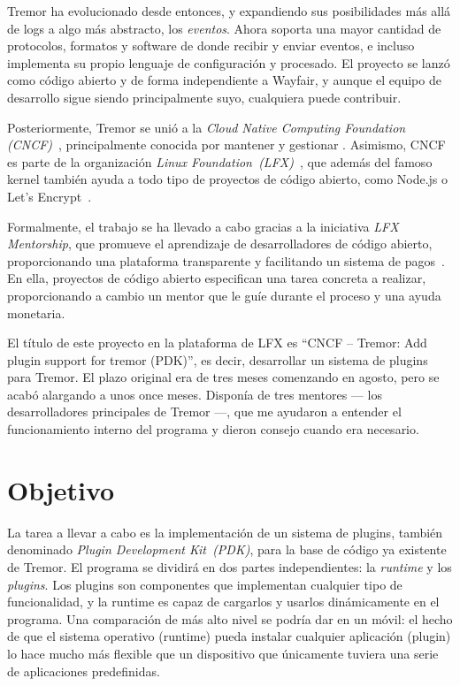 Tremor ha evolucionado desde entonces, y expandiendo sus posibilidades más allá
de logs a algo más abstracto, los \emph{eventos}. Ahora soporta una mayor
cantidad de protocolos, formatos y software de donde recibir y enviar eventos, e
incluso implementa su propio lenguaje de configuración y procesado. El proyecto
se lanzó como código abierto y de forma independiente a Wayfair, y aunque el
equipo de desarrollo sigue siendo principalmente suyo, cualquiera puede
contribuir.

Posteriormente, Tremor se unió a la \emph{Cloud Native Computing Foundation
(CNCF)}~\cite{cncf}, principalmente conocida por mantener y gestionar
. Asimismo, CNCF es parte de la organización \emph{Linux
Foundation~(LFX)}~\cite{lfx}, que además del famoso kernel también ayuda a todo
tipo de proyectos de código abierto, como Node.js o Let's
Encrypt~\cite{lfx_projects}.

Formalmente, el trabajo se ha llevado a cabo gracias a la iniciativa \emph{LFX
Mentorship}, que promueve el aprendizaje de desarrolladores de código abierto,
proporcionando una plataforma transparente y facilitando un sistema de
pagos~\cite{lfx_mentorship}. En ella, proyectos de código abierto especifican
una tarea concreta a realizar, proporcionando a cambio un mentor que le guíe
durante el proceso y una ayuda monetaria.

El título de este proyecto en la plataforma de LFX es ``CNCF -- Tremor: Add
plugin support for tremor (PDK)'', es decir, desarrollar un sistema de plugins
para Tremor. El plazo original era de tres meses comenzando en agosto, pero se
acabó alargando a unos once meses. Disponía de tres mentores --- los
desarrolladores principales de Tremor ---, que me ayudaron a entender el
funcionamiento interno del programa y dieron consejo cuando era necesario.

\section{Objetivo}

La tarea a llevar a cabo es la implementación de un sistema de plugins, también
denominado \emph{Plugin Development Kit~(PDK)}, para la base de código ya
existente de Tremor. El programa se dividirá en dos partes independientes: la
\emph{runtime} y los \emph{plugins}. Los plugins son componentes que implementan
cualquier tipo de funcionalidad, y la runtime es capaz de cargarlos y usarlos
dinámicamente en el programa. Una comparación de más alto nivel se podría dar en
un móvil: el hecho de que el sistema operativo (runtime) pueda instalar
cualquier aplicación (plugin) lo hace mucho más flexible que un dispositivo que
únicamente tuviera una serie de aplicaciones predefinidas.

